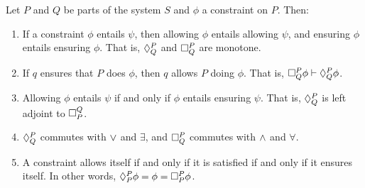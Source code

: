     \begin{prop} \label{Things:prop:compatible.and.ensures} Let $P$ and $Q$ be parts of the system $S$ and $\phi$ a constraint on $P$. Then:
    \begin{enumerate}
        \item If a constraint $\phi$ entails $\psi$, then allowing $\phi$ entails allowing $\psi$, and ensuring $\phi$ entails ensuring $\phi$. That is, $\allows{P}{Q}$ and $\ensure{P}{Q}$ are monotone.
        \item If $q$ ensures that $P$ does $\phi$, then $q$ allows $P$ doing $\phi$. That is, $\ensure{P}{Q}\phi \vdash \allows{P}{Q}\phi$.
        \item Allowing $\phi$ entails $\psi$ if and only if $\phi$ entails ensuring $\psi$. That is, $\allows{P}{Q}$ is left adjoint to $\ensure{Q}{P}$.
        \item $\allows{P}{Q}$ commutes with $\join$ and $\exists$, and $\ensure{P}{Q}$ commutes with $\meet$ and $\forall$.
        \item A constraint allows itself if and only if it is satisfied if and only if it ensures itself. In other words, $\allows{P}{P}\phi = \phi = \ensure{P}{P}\phi$.

    \end{enumerate}
    \end{prop}
